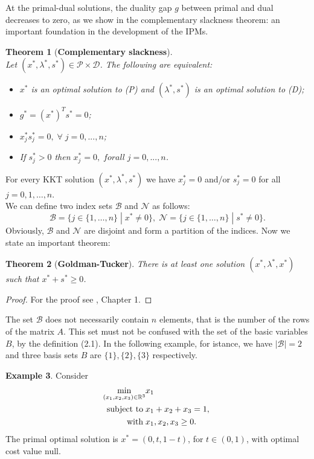 \documentclass[a4paper,10 pt,titlepage,twoside]{report}
\theoremstyle{plain}
\newtheorem{thm}{Theorem}[chapter]
\theoremstyle{definition}
\newtheorem{ex}[thm]{Example}
\theoremstyle{remark}
\begin{document}
At the primal-dual solutions, the duality gap $g$ between primal and dual decreases to zero, as we show in the complementary slackness theorem: an important foundation in the development of the IPMs.
\newpage
\begin{thm}[\textbf{Complementary slackness}] \ \\
	Let $(x^{*},\lambda^{*},s^{*})\in\mathcal{P}\times\mathcal{D}$. The following are equivalent:
	\begin{itemize}
		\item $x^{*}$ is an optimal solution to (P) and $(\lambda^{*},s^{*})$ is an optimal solution to (D);
		\item $g^{*} = (x^{*})^{T}s^{*}=0$;
		\item $x^{*}_{j}s^{*}_{j}=0,\;\forall\; j=0,...,n$;
		\item If $s^{*}_{j} > 0$ then $x^{*}_{j}= 0,\;for all\; j=0,...,n$.
	\end{itemize}
\end{thm}

For every KKT solution $(x^{*}, \lambda^{*}, s^{*})$ we have $x_{j}^{*}= 0$ and/or $s_{j}^{*}= 0$ for all $j=0,1,\dots,n$.\\
We can define two index sets $\mathcal{B}$ and $\mathcal{N}$ as follows:
\begin{equation}\label{index}\tag{2.9}
\mathcal{B} =\{j\in\{1,\dots,n\}\;|\; x^{*} \not= 0\}, \;
\mathcal{N} =\{j\in\{1,\dots,n\}\;|\; s^{*} \not= 0\}.
\end{equation}  
Obviously, $\mathcal{B}$ and $\mathcal{N}$ are disjoint and form a partition of the indices. Now we state an important theorem:
\begin{thm}[\textbf{Goldman-Tucker}]
	There is at least one solution $(x^{*}, \lambda^{*}, x^{*})$ such that $x^{*}+s^{*}\geq0$.
\end{thm}
\begin{proof}
	For the proof see \cite{Wright}, Chapter 1.
\end{proof}
The set $\mathcal{B}$ does not necessarily contain $n$ elements, that is the number of the rows of the matrix $A$. This set must not be confused with the set of the basic variables $B$, by the definition (2.1). In the following example, for istance, we have $|\mathcal{B}|= 2$ and three basis sets $B$ are $\{1\}, \{2\}, \{3\}$ respectively.
\begin{ex}
Consider
\begin{align*} \min\limits_{(x_{1},x_{2},x_{3})\in\mathbb{R}^{3}} &x_{1}\\ \text{\;subject to\;} &x_{1}+x_{2}+x_{3} = 1,\; \\
 \text{\; with\;} &x_{1}, x_{2}, x_{3} \geq 0.
 \end{align*}
The primal optimal solution is $x^{*}=(0, t, 1-t)$, for $t\in(0,1)$, with optimal cost value null. 	
\end{ex} 
\end{document}
